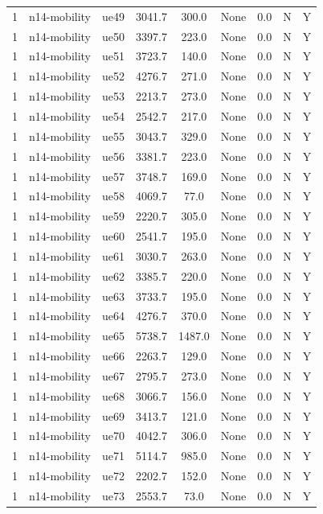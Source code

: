 \begin{table}[ht]
\begin{tabular}{|c|c|c|c|c|c|c|c|c|}
1 & n14-mobility & ue49 & 3041.7 & 300.0 & None & 0.0 & N & Y \\
1 & n14-mobility & ue50 & 3397.7 & 223.0 & None & 0.0 & N & Y \\
1 & n14-mobility & ue51 & 3723.7 & 140.0 & None & 0.0 & N & Y \\
1 & n14-mobility & ue52 & 4276.7 & 271.0 & None & 0.0 & N & Y \\
1 & n14-mobility & ue53 & 2213.7 & 273.0 & None & 0.0 & N & Y \\
1 & n14-mobility & ue54 & 2542.7 & 217.0 & None & 0.0 & N & Y \\
1 & n14-mobility & ue55 & 3043.7 & 329.0 & None & 0.0 & N & Y \\
1 & n14-mobility & ue56 & 3381.7 & 223.0 & None & 0.0 & N & Y \\
1 & n14-mobility & ue57 & 3748.7 & 169.0 & None & 0.0 & N & Y \\
1 & n14-mobility & ue58 & 4069.7 & 77.0 & None & 0.0 & N & Y \\
1 & n14-mobility & ue59 & 2220.7 & 305.0 & None & 0.0 & N & Y \\
1 & n14-mobility & ue60 & 2541.7 & 195.0 & None & 0.0 & N & Y \\
1 & n14-mobility & ue61 & 3030.7 & 263.0 & None & 0.0 & N & Y \\
1 & n14-mobility & ue62 & 3385.7 & 220.0 & None & 0.0 & N & Y \\
1 & n14-mobility & ue63 & 3733.7 & 195.0 & None & 0.0 & N & Y \\
1 & n14-mobility & ue64 & 4276.7 & 370.0 & None & 0.0 & N & Y \\
1 & n14-mobility & ue65 & 5738.7 & 1487.0 & None & 0.0 & N & Y \\
1 & n14-mobility & ue66 & 2263.7 & 129.0 & None & 0.0 & N & Y \\
1 & n14-mobility & ue67 & 2795.7 & 273.0 & None & 0.0 & N & Y \\
1 & n14-mobility & ue68 & 3066.7 & 156.0 & None & 0.0 & N & Y \\
1 & n14-mobility & ue69 & 3413.7 & 121.0 & None & 0.0 & N & Y \\
1 & n14-mobility & ue70 & 4042.7 & 306.0 & None & 0.0 & N & Y \\
1 & n14-mobility & ue71 & 5114.7 & 985.0 & None & 0.0 & N & Y \\
1 & n14-mobility & ue72 & 2202.7 & 152.0 & None & 0.0 & N & Y \\
1 & n14-mobility & ue73 & 2553.7 & 73.0 & None & 0.0 & N & Y \\

\end{tabular}
\end{table}
